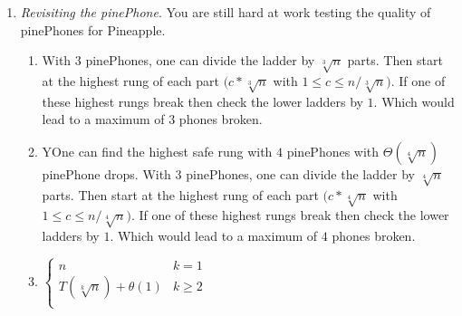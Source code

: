 \documentclass[letterpaper,11pt]{article}
\begin{document}
\begin{enumerate}
\item \emph{Revisiting the pinePhone}. You are still hard at work testing the quality of pinePhones for Pineapple. 

\begin{enumerate}
\item With $3$ pinePhones, one can divide the ladder by $\sqrt[3]{n}$ parts. Then start at the highest rung of each part $(c*\sqrt[3]{n}$ with $1 \leq c \leq n/\sqrt[3]{n})$. If one of these highest rungs break then check the lower ladders by $1$. Which would lead to a maximum of $3$  phones broken.
\item YOne can find the highest safe rung with $4$ pinePhones with $\Theta(\sqrt[4]{n})$ pinePhone drops.
With $3$ pinePhones, one can divide the ladder by $\sqrt[4]{n}$ parts. Then start at the highest rung of each part $(c*\sqrt[4]{n}$ with $1 \leq c \leq n/\sqrt[4]{n})$. If one of these highest rungs break then check the lower ladders by $1$. Which would lead to a maximum of $4$  phones broken.
\item 
$\begin{cases} 
       n &  k = 1\\
      T(\sqrt[k]{n})+\theta(1) & k \geq 2\\
 \end{cases}$
\end{enumerate}
\end{enumerate}
\end{document}
